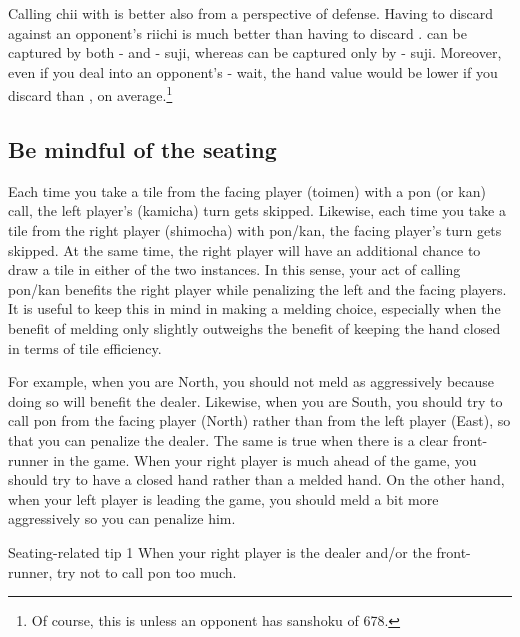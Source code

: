 \bigskip
Calling {\jap chii} with {\LARGE{}} is better also from a perspective of defense. Having to discard {\LARGE{}} against an opponent's riichi is much better than having to discard {\LARGE{}}. {\LARGE{}} can be captured by both {\LARGE{}-} and {\LARGE{}-} {\jap suji}, whereas {\LARGE{}} can be captured only by {\LARGE{}-} {\jap suji}. Moreover, even if you deal into an opponent's {\LARGE{}-} wait, the hand value would be lower if you discard {\LARGE{}} than {\LARGE{}}, on average.\footnote{Of course, this is unless an opponent has {\jap sanshoku} of 678.} 


\subsection{Be mindful of the seating}
Each time you take a tile from the facing player ({\jap toimen}) with a {\jap pon} (or {\jap kan}) call, the left player's ({\jap kamicha}) turn gets skipped. Likewise, each time you take a tile from the right player ({\jap shimocha}) with {\jap pon/kan}, the facing player's turn gets skipped. At the same time, the right player will have an additional chance to draw a tile in either of the two instances. In this sense, your act of calling {\jap pon/kan} benefits the right player while penalizing the left and the facing players. 
It is useful to keep this in mind in making a melding choice, especially when the benefit of melding only slightly outweighs the benefit of keeping the hand closed in terms of tile efficiency.

\bigskip
For example, when you are North, you should not meld as aggressively because doing so will benefit the dealer. Likewise, when you are South, you should try to call {\jap pon} from the facing player (North) rather than from the left player (East), so that you can penalize the dealer. 
The same is true when there is a clear front-runner in the game. When your right player is much ahead of the game, you should try to have a closed hand rather than a melded hand. On the other hand, when your left player is leading the game, you should meld a bit more aggressively so you can penalize him. 

\begin{itembox}[c]{Seating-related tip 1}
When your right player is the dealer and/or the front-runner, try not to call {\jap pon} too much. 
\end{itembox}

